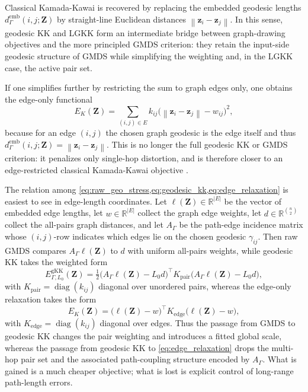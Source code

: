 \documentclass[11pt]{article}
\newcommand{\R}{\mathbb{R}}
\newcommand{\bz}{\mathbf{z}}
\newcommand{\bZ}{\mathbf{Z}}
\newcommand{\norm}[1]{\left\|#1\right\|}
\newcommand{\demb}{d^{\mathrm{emb}}}
\newcommand{\diag}{\operatorname{diag}}
\begin{document}
Classical Kamada-Kawai is recovered by replacing the embedded geodesic
lengths $\demb_{\Gamma}(i,j;\bZ)$ by straight-line Euclidean distances
$\norm{\bz_i - \bz_j}$.  In this sense, geodesic KK and LGKK form an
intermediate bridge between graph-drawing objectives and the more
principled GMDS criterion: they retain the input-side geodesic structure
of GMDS while simplifying the weighting and, in the LGKK case, the active
pair set.

If one simplifies further by restricting the sum to graph edges only, one
obtains the edge-only functional
\begin{equation}
  E_K(\bZ)
  = \sum_{(i,j) \in E} k_{ij}\bigl(\norm{\bz_i - \bz_j} - w_{ij}\bigr)^2,
  \label{eq:edge_relaxation}
\end{equation}
because for an edge $(i,j)$ the chosen graph geodesic is the edge itself and
thus $\demb_{\Gamma}(i,j;\bZ) = \norm{\bz_i - \bz_j}$.  This is no longer the
full geodesic KK or GMDS criterion: it penalizes only single-hop
distortion, and is therefore closer to an edge-restricted classical
Kamada-Kawai objective \citep{kamada1989algorithm, fruchterman1991graph}.

The relation among \cref{eq:raw_geo_stress,eq:geodesic_kk,eq:edge_relaxation}
is easiest to see in edge-length coordinates.  Let $\ell(\bZ) \in \R^{|E|}$
be the vector of embedded edge lengths, let $w \in \R^{|E|}$ collect the
graph edge weights, let $d \in \R^{\binom{n}{2}}$ collect the all-pairs
graph distances, and let $A_{\Gamma}$ be the path-edge incidence matrix
whose $(i,j)$-row indicates which edges lie on the chosen geodesic
$\gamma_{ij}$.  Then raw GMDS compares $A_{\Gamma}\ell(\bZ)$ to $d$ with
uniform all-pairs weights, while geodesic KK takes the weighted form
\begin{equation}
  E_{\Gamma,L_0}^{\mathrm{gKK}}(\bZ)
  = \tfrac{1}{2}\bigl(A_{\Gamma}\ell(\bZ) - L_0 d\bigr)^\top
    K_{\mathrm{pair}}
    \bigl(A_{\Gamma}\ell(\bZ) - L_0 d\bigr),
  \label{eq:path_incidence_gkk}
\end{equation}
with $K_{\mathrm{pair}} = \diag(k_{ij})$ diagonal over unordered pairs,
whereas the edge-only relaxation takes the form
\begin{equation}
  E_K(\bZ)
  = \bigl(\ell(\bZ)-w\bigr)^\top K_{\mathrm{edge}} \bigl(\ell(\bZ)-w\bigr),
  \label{eq:edge_relaxation_matrix}
\end{equation}
with $K_{\mathrm{edge}} = \diag(k_{ij})$ diagonal over edges.  Thus the
passage from GMDS to geodesic KK changes the pair weighting and introduces
a fitted global scale, whereas the passage from geodesic KK to
\cref{eq:edge_relaxation} drops the multi-hop pair set and the associated
path-coupling structure encoded by $A_{\Gamma}$.  What is gained is a much
cheaper objective; what is lost is explicit control of long-range
path-length errors.
\end{document}
